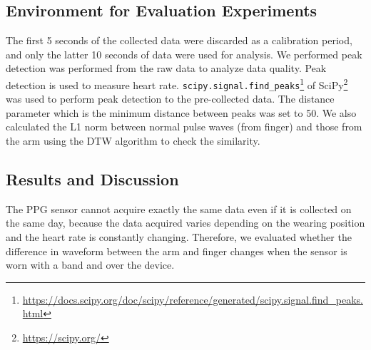 \documentclass[sigconf]{acmart}
\begin{document}
\subsection{Environment for Evaluation Experiments}
The first 5 seconds of the collected data were discarded as a calibration period, and only the latter 10 seconds of data were used for analysis. We performed peak detection was performed from the raw data to analyze data quality. Peak detection is used to measure heart rate. \texttt{scipy.signal.find\_peaks}\footnote{\url{https://docs.scipy.org/doc/scipy/reference/generated/scipy.signal.find_peaks.html}} of SciPy\footnote{\url{https://scipy.org/}} was used to perform peak detection to the pre-collected data. The distance parameter which is the minimum distance between peaks was set to 50. We also calculated the L1 norm between normal pulse waves (from finger) and those from the arm using the DTW algorithm to check the similarity.


\subsection{Results and Discussion}
The PPG sensor cannot acquire exactly the same data even if it is collected on the same day, because the data acquired varies depending on the wearing position and the heart rate is constantly changing. Therefore, we evaluated whether the difference in waveform between the arm and finger changes when the sensor is worn with a band and over the device.\par
\end{document}
